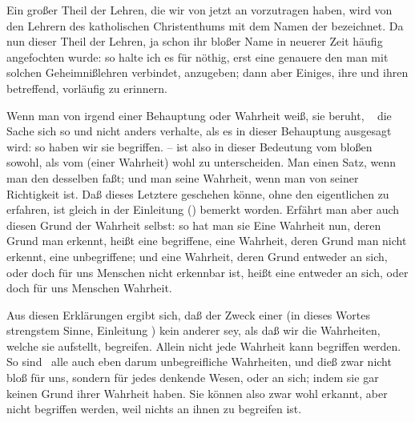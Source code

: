 \begin{aufza}
\end{aufza}

\begin{aufza}
\item Ein großer Theil der Lehren, die wir von jetzt an vorzutragen haben, wird von den Lehrern des katholischen Christenthums mit dem Namen der  bezeichnet. Da nun dieser Theil der Lehren, ja schon ihr bloßer Name in neuerer Zeit häufig angefochten wurde: so halte ich es für nöthig, erst eine genauere  den man mit solchen Geheimnißlehren verbindet, anzugeben; dann aber Einiges, ihre  und ihren  betreffend, vorläufig zu erinnern.~
\item Wenn man von irgend einer Behauptung oder Wahrheit weiß,  sie beruht, \dh\  die Sache sich so und nicht anders verhalte, als es in dieser Behauptung ausgesagt wird: so haben wir sie begriffen. --  ist also in dieser Bedeutung vom bloßen  sowohl, als vom  (einer Wahrheit) wohl zu unterscheiden. Man  einen Satz, wenn man den  desselben faßt; und man  seine Wahrheit, wenn man von seiner Richtigkeit  ist. Daß dieses Letztere geschehen könne, ohne den eigentlichen  zu erfahren, ist gleich in der Einleitung () bemerkt worden. Erfährt man aber auch diesen Grund der Wahrheit selbst: so hat man sie  Eine Wahrheit nun, deren Grund man erkennt, heißt eine begriffene, eine Wahrheit, deren Grund man nicht erkennt, eine unbegriffene; und eine Wahrheit, deren Grund entweder an sich, oder doch für uns Menschen nicht erkennbar ist, heißt eine entweder an sich, oder doch für uns Menschen  Wahrheit.
\item Aus diesen Erklärungen ergibt sich, daß der Zweck einer  (in dieses Wortes strengstem Sinne, Einleitung ) kein anderer sey, als daß wir die Wahrheiten, welche sie aufstellt, begreifen. Allein nicht jede Wahrheit kann begriffen werden. So sind \zB\ alle  auch eben darum unbegreifliche Wahrheiten, und dieß zwar nicht bloß für uns, sondern für jedes denkende Wesen, oder an sich; indem sie gar keinen Grund ihrer Wahrheit haben. Sie können also zwar wohl erkannt, aber nicht begriffen werden, weil nichts an ihnen zu begreifen ist.

\end{aufza}
